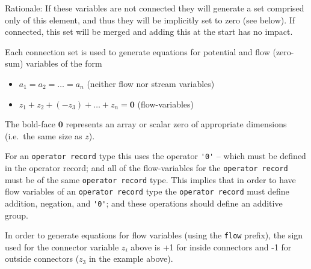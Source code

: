 \begin{nonnormative}
Rationale: If these variables are not connected they will
generate a set comprised only of this element, and thus they will be
implicitly set to zero (see below). If connected, this set will be
merged and adding this at the start has no impact.
\end{nonnormative}

Each connection set is used to generate equations for potential and flow
(zero-sum) variables of the form
\begin{itemize}
\item
$a_{1} = a_{2} = \ldots = a_{n}$ (neither flow nor stream variables)
\item
$z_{1} + z_{2} + (-z_{3}) + \ldots + z_{n} = \mathbf{0}$ (flow-variables)
\end{itemize}

The bold-face $\mathbf{0}$ represents an array or scalar zero of
appropriate dimensions (i.e.\ the same size as $z$).

For an \lstinline!operator record! type this uses the operator \lstinline!'0'! -- which must be
defined in the operator record; and all of the flow-variables for the
\lstinline!operator record! must be of the same \lstinline!operator record! type. This implies
that in order to have flow variables of an \lstinline!operator record! type the
\lstinline!operator record! must define addition, negation, and \lstinline!'0'!; and these
operations should define an additive group.

In order to generate equations for flow variables (using the
\lstinline!flow! prefix), the sign used for the connector variable
$z_{i}$ above is +1 for inside connectors and -1 for outside
connectors ($z_{3}$ in the example above).

